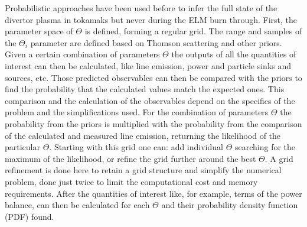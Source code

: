Probabilistic approaches have been used before to infer the full state of the divertor plasma in tokamaks but never during the ELM burn through.\cite{Verhaegh2017,Verhaegh2020,Bowman2020} First, the parameter space of $\Theta$  is defined, forming a regular grid. The range and samples of the $\Theta_i$ parameter are defined based on Thomson scattering and other priors. Given a certain combination of parameters $\Theta$ the outputs of all the quantities of interest can then be calculated, like line emission, power and particle sinks and sources, etc. Those predicted observables can then be compared with the priors to find the probability that the calculated values match the expected ones. This comparison and the calculation of the observables depend on the specifics of the problem and the simplifications used. For the combination of parameters $\Theta$ the probability from the priors is multiplied with the probability from the comparison of the calculated and measured line emission, returning the likelihood of the particular $\Theta$. Starting with this grid one can: add individual $\Theta$ searching for the maximum of the likelihood, or refine the grid further around the best $\Theta$. A grid refinement is done here to retain a grid structure and simplify the numerical problem, done just twice to limit the computational cost and memory requirements. After the quantities of interest like, for example, terms of the power balance, can then be calculated for each $\Theta$ and their probability density function (PDF) found.


